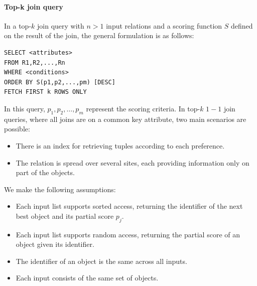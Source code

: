 \paragraph*{Top-k join query}
In a top-$k$ join query with $n>1$ input relations and a scoring function $S$ defined on the result of the join, the general formulation is as follows:
\begin{lstlisting}[style=SQL]
SELECT <attributes>
FROM R1,R2,...,Rn
WHERE <conditions>
ORDER BY S(p1,p2,...,pm) [DESC]
FETCH FIRST k ROWS ONLY             
\end{lstlisting}
In this query, $p_1, p_2, \dots, p_m$ represent the scoring criteria.
In top-$k$ $1-1$ join queries, where all joins are on a common key attribute, two main scenarios are possible:
\begin{itemize}
    \item There is an index for retrieving tuples according to each preference.
    \item The relation is spread over several sites, each providing information only on part of the objects.
\end{itemize}
We make the following assumptions: 
\begin{itemize}
    \item Each input list supports sorted access, returning the identifier of the next best object and its partial score $p_j$.
    \item Each input list supports random access, returning the partial score of an object given its identifier.
    \item The identifier of an object is the same across all inputs.
    \item Each input consists of the same set of objects.
\end{itemize}
